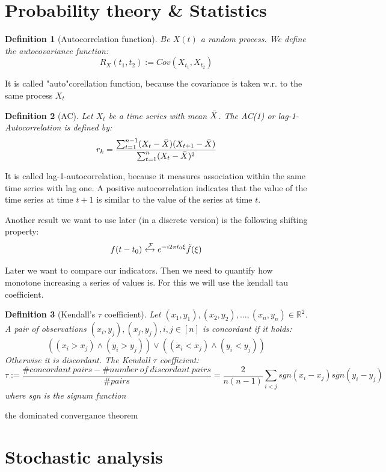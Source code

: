 \documentclass[%
thesis=student,%
coverpage=false,%
titlepage=false,%
headmarks=true, %
german,%
font=libertine, %
math=newpxtx, %
BCOR=5mm,%
coverBCOR=11mm%
]{tumbook}
\newtheorem{definition}{Definition}[section]
\begin{document}
\section{Probability theory \& Statistics}

\begin{definition}[Autocorrelation function]
Be $X(t)$ a random process. We define the autocovariance function: 
\[
R_{X}(t_{1},t_{2}) := Cov(X_{t_{1}},X_{t_{2}})
\]    
\end{definition}

It is called "auto"corellation function, because the covariance is taken w.r. to the same process $X_{t}$


\begin{definition}[AC]
Let $X_{t}$ be a time series with mean $\Bar{X}$. The AC(1) or lag-1-Autocorrelation is defined by: 
\[
r_{k} = \frac{\sum_{t=1}^{n-1}(X_{t}-\Bar{X})(X_{t+1}-\Bar{X})}{\sum_{t=1}^{n}(X_{t}-\Bar{X})^2}
\]
\end{definition}
It is called lag-1-autocorrelation, because it measures association within the same time series with lag one. A positive autocorrelation indicates that the value of the time series at time $t + 1$ is similar to the value of the series at time $t$. 


Another result we want to use later (in a discrete version) is the following shifting property:
\[
f(t-t_{0}) \xleftrightarrow{\mathcal{F}} e^{-i2\pi t_{0}\xi}\Tilde{f}(\xi)
\]

Later we want to compare our indicators. Then we need to quantify how monotone increasing a series of values is. For this we will use the kendall tau coefficient. 

\begin{definition}[Kendall's $\tau$ coefficient]
\label{def:Kendall tau}
Let $(x_{1},y_{1}),(x_{2},y_{2}),...,(x_{n},y_{n})\in \mathbb{R}^{2}$. A pair of observations $(x_{i},y_{j}),(x_{j},y_{j}), i,j \in [n]$ is concordant if it holds:
\[
((x_{i} > x_{j}) \wedge (y_{i} > y_{j})) \vee
((x_{i} < x_{j}) \wedge (y_{i} < y_{j}))
\]
Otherwise it is discordant. The Kendall $\tau$ coefficient:
\[
\tau := \frac{\#concordant\ pairs - \#number\ of\ discordant\ pairs}{\#pairs} = \frac{2}{n(n-1)}\sum_{i<j}sgn(x_{i}-x_{j})sgn(y_{i}-y_{j})
\]
where sgn is the signum function    
\end{definition}

the dominated convergance theorem

\section{Stochastic analysis}
\end{document}
